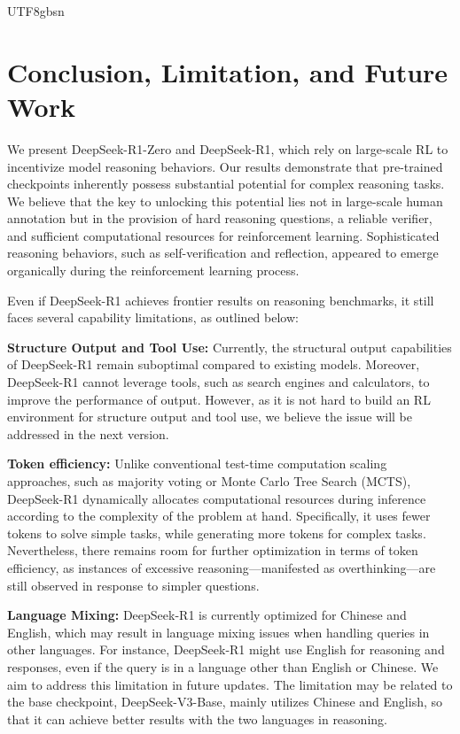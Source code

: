 \documentclass[11pt, a4paper, logo, copyright, nonumbering]{deepseek}
\begin{document}
\begin{CJK*}{UTF8}{gbsn}
\section{ Conclusion, Limitation, and Future Work}
We present DeepSeek-R1-Zero and DeepSeek-R1, which rely on large-scale RL to incentivize model reasoning behaviors. Our results demonstrate that pre-trained checkpoints inherently possess substantial potential for complex reasoning tasks. We believe that the key to unlocking this potential lies not in large-scale human annotation but in the provision of hard reasoning questions, a reliable verifier, and sufficient computational resources for reinforcement learning. Sophisticated reasoning behaviors, such as self-verification and reflection, appeared to emerge organically during the reinforcement learning process.

\label{sec:limit}
Even if DeepSeek-R1 achieves frontier results on reasoning benchmarks, it still faces several capability limitations, as outlined below:

 \textbf{Structure Output and Tool Use:}
Currently, the structural output capabilities of DeepSeek-R1 remain suboptimal compared to existing models. Moreover, DeepSeek-R1 cannot leverage tools, such as search engines and calculators, to improve the performance of output. However, as it is not hard to build an RL environment for structure output and tool use, we believe the issue will be addressed in the next version.
  
  \textbf{Token efficiency:} Unlike conventional test-time computation scaling approaches, such as majority voting or Monte Carlo Tree Search (MCTS), DeepSeek-R1 dynamically allocates computational resources during inference according to the complexity of the problem at hand. Specifically, it uses fewer tokens to solve simple tasks, while generating more tokens for complex tasks. Nevertheless, there remains room for further optimization in terms of token efficiency, as instances of excessive reasoning—manifested as overthinking—are still observed in response to simpler questions.
  
 \textbf{Language Mixing:}
DeepSeek-R1 is currently optimized for Chinese and English, which may result in language mixing issues when handling queries in other languages. For instance, DeepSeek-R1 might use English for reasoning and responses, even if the query is in a language other than English or Chinese. We aim to address this limitation in future updates. The limitation may be related to the base checkpoint, DeepSeek-V3-Base, mainly utilizes Chinese and English, so that it can achieve better results with the two languages in reasoning. 


\end{CJK*}
\end{document}
